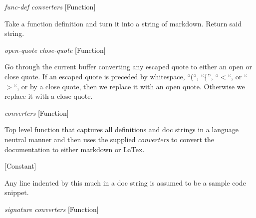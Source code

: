 \vspace{1em}
\noindent
{}
\usebox{\funcname}\emph{func-def} \emph{converters}
 \hfill [Function]
\hspace*{\wd\funcname}

\begin{doc-string}
Take a function definition and turn it into a string of markdown.  Return said string.
\end{doc-string}

\vspace{1em}
\noindent
{}
\usebox{\funcname}\emph{open-quote} \emph{close-quote}
 \hfill [Function]

\begin{doc-string}
Go through the current buffer converting any escaped quote to either an open or
close quote.  If an escaped quote is preceded by whitespace, ``(``, ``\{'', ``$<$``, or ``$>$``,
or by a close quote, then we replace it with an open quote.  Otherwise we replace it
with a close quote.
\end{doc-string}

\vspace{1em}
\noindent
{}
\usebox{\funcname}\emph{converters}
 \hfill [Function]

\begin{doc-string}
Top level function that captures all definitions and doc strings in a language
neutral manner and then uses the supplied \emph{converters} to convert the documentation to
either markdown or LaTex.
\end{doc-string}

\vspace{1em}
\noindent
{}
\usebox{\funcname}
 \hfill [Constant]

\begin{doc-string}
Any line indented by this much in a doc string is assumed to be a sample
code snippet.
\end{doc-string}

\vspace{1em}
\noindent
{}
\usebox{\funcname}\emph{signature} \emph{converters}
 \hfill [Function]

